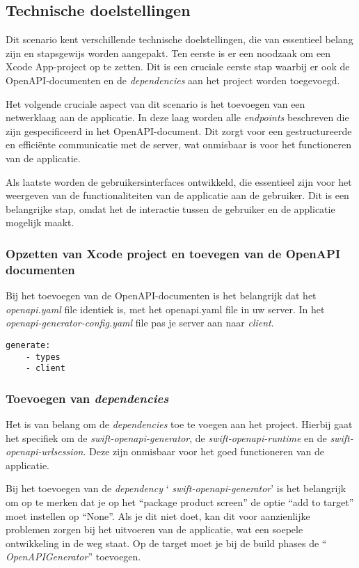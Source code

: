 \subsection{Technische doelstellingen}
Dit scenario kent verschillende technische doelstellingen, die van essentieel belang zijn en stapsgewijs worden aangepakt. Ten eerste is er een noodzaak om een Xcode App-project op te zetten. Dit is een cruciale eerste stap waarbij er ook de OpenAPI-documenten en de \textit{dependencies} aan het project worden toegevoegd. 

Het volgende cruciale aspect van dit scenario is het toevoegen van een netwerklaag aan de applicatie. In deze laag worden alle \textit{endpoints} beschreven die zijn gespecificeerd in het OpenAPI-document. Dit zorgt voor een gestructureerde en efficiënte communicatie met de server, wat onmisbaar is voor het functioneren van de applicatie.

Als laatste worden de gebruikersinterfaces ontwikkeld, die essentieel zijn voor het weergeven van de functionaliteiten van de applicatie aan de gebruiker. Dit is een belangrijke stap, omdat het de interactie tussen de gebruiker en de applicatie mogelijk maakt.

\subsubsection{Opzetten van Xcode project en toevegen van de OpenAPI documenten}
Bij het toevoegen van de OpenAPI-documenten is het belangrijk dat het \textit{openapi.yaml} file identiek is, met het openapi.yaml file in uw server. In het \textit{openapi-generator-config.yaml} file pas je server aan naar \textit{client}. 

\begin{lstlisting}[caption=openapi-generator-config.yaml client file]
    generate:
    - types
    - client
\end{lstlisting}

\subsubsection{Toevoegen van \textit{dependencies}}
Het is van belang om de \textit{dependencies} toe te voegen aan het project. Hierbij gaat het specifiek om de  \textit{swift-openapi-generator}, de  \textit{swift-openapi-runtime} en de  \textit{swift-openapi-urlsession}. Deze zijn onmisbaar voor het goed functioneren van de applicatie.

Bij het toevoegen van de \textit{dependency} ‘ \textit{swift-openapi-generator}’ is het belangrijk om op te merken dat je op het “package product screen” de optie “add to target” moet instellen op “None”. Als je dit niet doet, kan dit voor aanzienlijke problemen zorgen bij het uitvoeren van de applicatie, wat een soepele ontwikkeling in de weg staat. Op de target moet je bij de build phases de “ \textit{OpenAPIGenerator}” toevoegen. 


